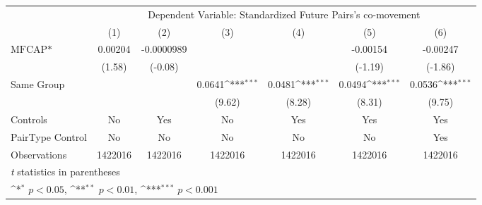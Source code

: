 {
\def\sym#1{\ifmmode^{#1}\else\(^{#1}\)\fi}
\begin{tabular}{l*{6}{c}}
\hline\hline
                &\multicolumn{6}{c}{Dependent Variable: Standardized Future Pairs's co-movement}                                  \\\cmidrule(lr){2-7}
                &\multicolumn{1}{c}{(1)}         &\multicolumn{1}{c}{(2)}         &\multicolumn{1}{c}{(3)}         &\multicolumn{1}{c}{(4)}         &\multicolumn{1}{c}{(5)}         &\multicolumn{1}{c}{(6)}         \\
\hline
$ \text{MFCAP*} $&  0.00204         &-0.0000989         &                  &                  & -0.00154         & -0.00247         \\
                &   (1.58)         &  (-0.08)         &                  &                  &  (-1.19)         &  (-1.86)         \\
[1em]
Same Group      &                  &                  &   0.0641\sym{***}&   0.0481\sym{***}&   0.0494\sym{***}&   0.0536\sym{***}\\
                &                  &                  &   (9.62)         &   (8.28)         &   (8.31)         &   (9.75)         \\
\hline
Controls        &       No         &      Yes         &       No         &      Yes         &      Yes         &      Yes         \\
PairType Control&       No         &       No         &       No         &       No         &       No         &      Yes         \\
Observations    &  1422016         &  1422016         &  1422016         &  1422016         &  1422016         &  1422016         \\
\hline\hline
\multicolumn{7}{l}{\footnotesize \textit{t} statistics in parentheses}\\
\multicolumn{7}{l}{\footnotesize \sym{*} \(p<0.05\), \sym{**} \(p<0.01\), \sym{***} \(p<0.001\)}\\
\end{tabular}
}
